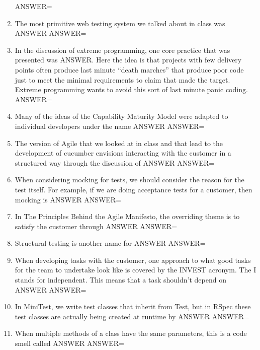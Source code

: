 \documentclass{exam}
\begin{document}
\begin{enumerate}
ANSWER=
\item The most primitive web testing system we talked about in class was ANSWER\newline
ANSWER=
\item In the discussion of extreme programming, one core practice that was presented was ANSWER.  Here the idea is that projects with few delivery points often produce last minute ``death marches'' that produce poor code just to meet the minimal requirements to claim that made the target.  Extreme programming wants to avoid this sort of last minute panic coding.\newline
ANSWER=
\item Many of the ideas of the Capability Maturity Model were adapted to individual developers under the name ANSWER\newline
ANSWER=
\item The version of Agile that we looked at in class and that lead to the development of cucumber envisions interacting with the customer in a structured way through the discussion of ANSWER\newline
ANSWER=
\item When considering mocking for tests, we should consider the reason for the test itself.  For example, if we are doing acceptance tests for a customer, then mocking is ANSWER\newline
ANSWER=
\item In The Principles Behind the Agile Manifesto, the overriding theme is to satisfy the customer through ANSWER\newline
ANSWER=
\item Structural testing is another name for ANSWER\newline
ANSWER=
\item When developing tasks with the customer, one approach to what good tasks for the team to undertake look like is covered by the INVEST acronym.  The I stands for independent.  This means that a task shouldn't depend on ANSWER\newline
ANSWER=
\item In MiniTest, we write test classes that inherit from Test, but in RSpec these test classes are actually being created at runtime by ANSWER\newline
ANSWER=
\item When multiple methods of a class have the same parameters, this is a code smell called ANSWER\newline
ANSWER=
\end{enumerate}
\end{document}
